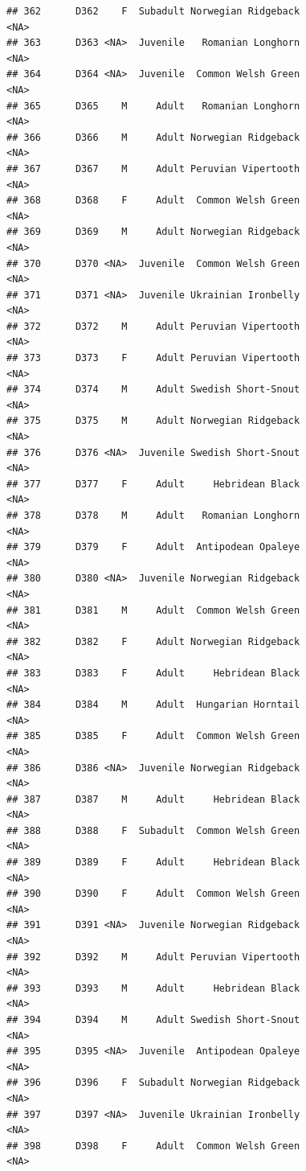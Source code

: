 \documentclass[
]{book}
\begin{document}
\begin{verbatim}
## 362      D362    F  Subadult Norwegian Ridgeback                <NA>
## 363      D363 <NA>  Juvenile   Romanian Longhorn                <NA>
## 364      D364 <NA>  Juvenile  Common Welsh Green                <NA>
## 365      D365    M     Adult   Romanian Longhorn                <NA>
## 366      D366    M     Adult Norwegian Ridgeback                <NA>
## 367      D367    M     Adult Peruvian Vipertooth                <NA>
## 368      D368    F     Adult  Common Welsh Green                <NA>
## 369      D369    M     Adult Norwegian Ridgeback                <NA>
## 370      D370 <NA>  Juvenile  Common Welsh Green                <NA>
## 371      D371 <NA>  Juvenile Ukrainian Ironbelly                <NA>
## 372      D372    M     Adult Peruvian Vipertooth                <NA>
## 373      D373    F     Adult Peruvian Vipertooth                <NA>
## 374      D374    M     Adult Swedish Short-Snout                <NA>
## 375      D375    M     Adult Norwegian Ridgeback                <NA>
## 376      D376 <NA>  Juvenile Swedish Short-Snout                <NA>
## 377      D377    F     Adult     Hebridean Black                <NA>
## 378      D378    M     Adult   Romanian Longhorn                <NA>
## 379      D379    F     Adult  Antipodean Opaleye                <NA>
## 380      D380 <NA>  Juvenile Norwegian Ridgeback                <NA>
## 381      D381    M     Adult  Common Welsh Green                <NA>
## 382      D382    F     Adult Norwegian Ridgeback                <NA>
## 383      D383    F     Adult     Hebridean Black                <NA>
## 384      D384    M     Adult  Hungarian Horntail                <NA>
## 385      D385    F     Adult  Common Welsh Green                <NA>
## 386      D386 <NA>  Juvenile Norwegian Ridgeback                <NA>
## 387      D387    M     Adult     Hebridean Black                <NA>
## 388      D388    F  Subadult  Common Welsh Green                <NA>
## 389      D389    F     Adult     Hebridean Black                <NA>
## 390      D390    F     Adult  Common Welsh Green                <NA>
## 391      D391 <NA>  Juvenile Norwegian Ridgeback                <NA>
## 392      D392    M     Adult Peruvian Vipertooth                <NA>
## 393      D393    M     Adult     Hebridean Black                <NA>
## 394      D394    M     Adult Swedish Short-Snout                <NA>
## 395      D395 <NA>  Juvenile  Antipodean Opaleye                <NA>
## 396      D396    F  Subadult Norwegian Ridgeback                <NA>
## 397      D397 <NA>  Juvenile Ukrainian Ironbelly                <NA>
## 398      D398    F     Adult  Common Welsh Green                <NA>

\end{verbatim}
\end{document}

